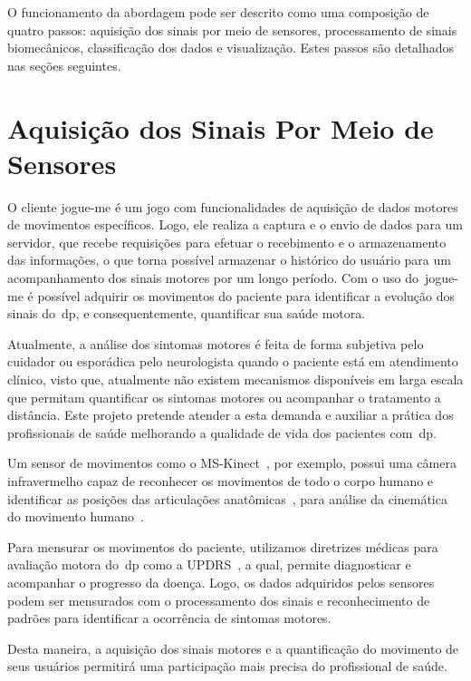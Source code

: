 O funcionamento da abordagem pode ser descrito como uma composição de quatro passos: aquisição dos sinais por meio de sensores, processamento de sinais biomecânicos, classificação dos dados e visualização. Estes passos são detalhados nas seções seguintes.

\section{Aquisição dos Sinais Por Meio de Sensores}
O cliente \ac{jogue-me} é um jogo com funcionalidades de aquisição de dados motores de movimentos específicos. Logo, ele realiza a captura e o envio de dados para um servidor, que recebe requisições para efetuar o recebimento e o armazenamento das informações, o que torna possível armazenar o histórico do usuário para um acompanhamento dos sinais motores por um longo período. Com o uso do~\ac{jogue-me} é possível adquirir os movimentos do paciente para identificar a evolução dos sinais do~\ac{dp}, e consequentemente, quantificar sua saúde motora. 

Atualmente, a análise dos sintomas motores é feita de forma subjetiva pelo cuidador ou esporádica pelo neurologista quando o paciente está em atendimento clínico, visto que, atualmente não existem mecanismos disponíveis em larga escala que permitam quantificar os sintomas motores ou acompanhar o tratamento a distância. Este projeto pretende atender a esta demanda e auxiliar a prática dos profissionais de saúde melhorando a qualidade de vida dos pacientes com~\ac{dp}.

Um sensor de movimentos como o MS-Kinect~\cite{kinnect2013}, por exemplo, possui uma câmera infravermelho capaz de reconhecer os movimentos de todo o corpo humano e identificar as posições das articulações anatômicas~\cite{hamill1999bases}, para análise da cinemática do movimento humano~\cite{mcginnis2013biomechanics}. 

Para mensurar os movimentos do paciente, utilizamos diretrizes médicas para avaliação motora do~\ac{dp} como a UPDRS~\cite{updrs87}, a qual, permite diagnosticar e acompanhar o progresso da doença. Logo, os dados adquiridos pelos sensores podem ser mensurados com o processamento dos sinais e reconhecimento de padrões para identificar a ocorrência de sintomas motores. 

Desta maneira, a aquisição dos sinais motores e a quantificação do movimento de seus usuários permitirá uma participação mais precisa do profissional de saúde.



